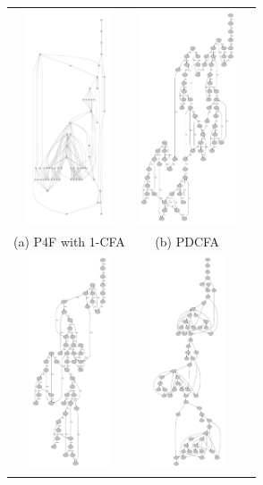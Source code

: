 \documentclass{article}
\begin{document}
\begin{figure}
\begin{center}
\begin{tabular}{ccc}
\includegraphics[height=2.5in]{1p4f.pdf}
&
\includegraphics[height=2.5in]{pdcfaWOgc.pdf}
\\
(a) P4F with 1-CFA
&
(b) PDCFA
\\
\includegraphics[height=2.5in]{pdcfa.pdf}
&
\includegraphics[height=2.5in]{hcfa.pdf}

\end{tabular}
\end{center}
\end{figure}
\end{document}
